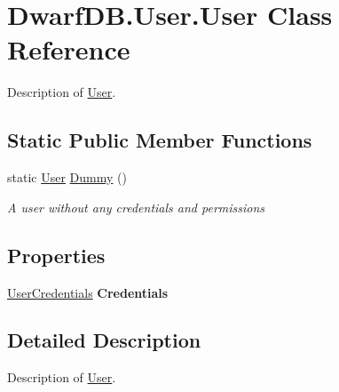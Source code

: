 \hypertarget{class_dwarf_d_b_1_1_user_1_1_user}{\section{Dwarf\+D\+B.\+User.\+User Class Reference}
\label{class_dwarf_d_b_1_1_user_1_1_user}
}


Description of \hyperlink{class_dwarf_d_b_1_1_user_1_1_user}{User}.  


\subsection*{Static Public Member Functions}
\begin{DoxyCompactItemize}
\item 
static \hyperlink{class_dwarf_d_b_1_1_user_1_1_user}{User} \hyperlink{class_dwarf_d_b_1_1_user_1_1_user_acea2310c87e9c0606c9ee370e5946ea9}{Dummy} ()
\begin{DoxyCompactList}\small\item\em A user without any credentials and permissions \end{DoxyCompactList}\end{DoxyCompactItemize}
\subsection*{Properties}
\begin{DoxyCompactItemize}
\item 
\hypertarget{class_dwarf_d_b_1_1_user_1_1_user_ab59cfb6b9b4044adc4f20bb342bd0eef}{\hyperlink{class_dwarf_d_b_1_1_user_1_1_user_credentials}{User\+Credentials} {\bfseries Credentials}}\label{class_dwarf_d_b_1_1_user_1_1_user_ab59cfb6b9b4044adc4f20bb342bd0eef}

\end{DoxyCompactItemize}


\subsection{Detailed Description}
Description of \hyperlink{class_dwarf_d_b_1_1_user_1_1_user}{User}. 



